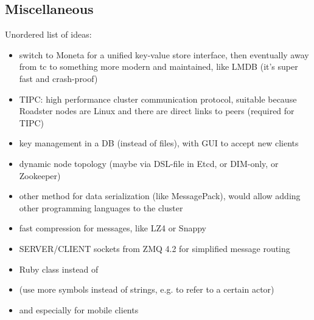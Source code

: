 \subsection{Miscellaneous}
Unordered list of ideas:
\begin{itemize}
	\item switch to Moneta for a unified key-value store interface, then eventually away from \gls{tc} to something more modern and maintained, like LMDB (it's super fast and crash-proof)
	\item TIPC: high performance cluster communication protocol, suitable because Roadster nodes are Linux and there are direct links to peers (required for TIPC)
	\item key management in a DB (instead of files), with GUI to accept new clients
	\item dynamic node topology (maybe via DSL-file in Etcd, or DIM-only, or Zookeeper)
	\item other method for data serialization (like MessagePack), would allow adding other programming languages to the cluster
	\item fast compression for messages, like LZ4 or Snappy
	\item SERVER/CLIENT sockets from ZMQ 4.2 for simplified message routing
	\item Ruby  class instead of 
	\item (use more symbols instead of strings, e.g. to refer to a certain actor)
	\item {} and  especially for mobile clients
\end{itemize}

